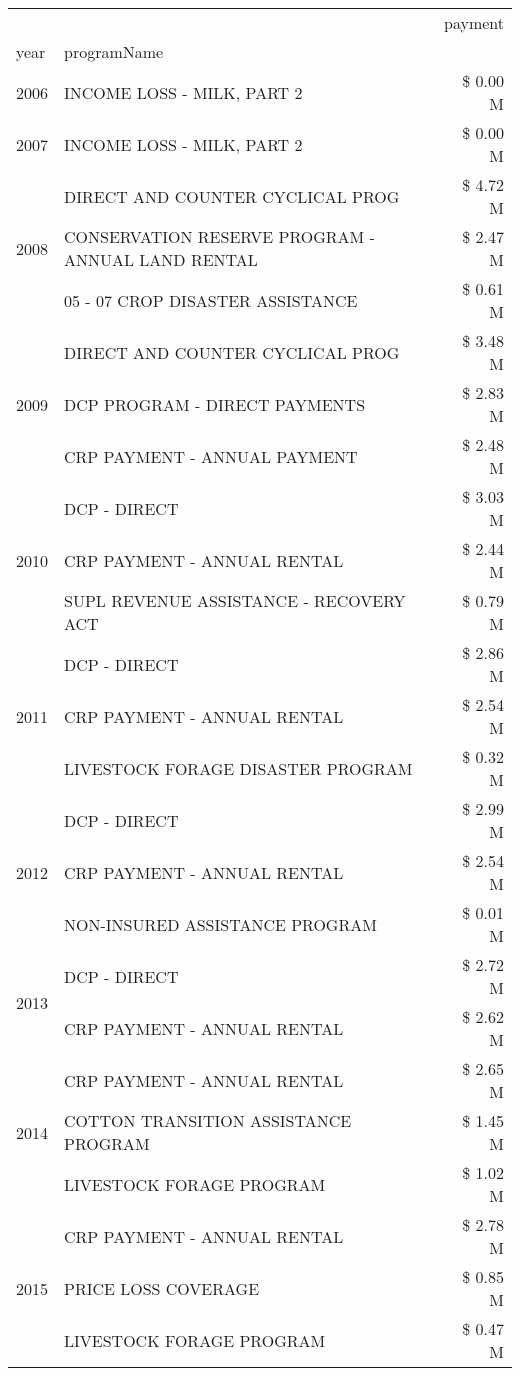 \begin{tabular}{llr}
\toprule
 &  & payment \\
year & programName &  \\
\midrule
2006 & INCOME LOSS - MILK, PART 2 & \$ 0.00 M \\
\cline{1-3}
2007 & INCOME LOSS - MILK, PART 2 & \$ 0.00 M \\
\cline{1-3}
\multirow[t]{3}{*}{2008} & DIRECT AND COUNTER CYCLICAL PROG & \$ 4.72 M \\
 & CONSERVATION RESERVE PROGRAM - ANNUAL LAND RENTAL & \$ 2.47 M \\
 & 05 - 07 CROP DISASTER ASSISTANCE & \$ 0.61 M \\
\cline{1-3}
\multirow[t]{3}{*}{2009} & DIRECT AND COUNTER CYCLICAL PROG & \$ 3.48 M \\
 & DCP PROGRAM - DIRECT PAYMENTS & \$ 2.83 M \\
 & CRP PAYMENT - ANNUAL PAYMENT & \$ 2.48 M \\
\cline{1-3}
\multirow[t]{3}{*}{2010} & DCP - DIRECT & \$ 3.03 M \\
 & CRP PAYMENT - ANNUAL RENTAL & \$ 2.44 M \\
 & SUPL REVENUE ASSISTANCE - RECOVERY ACT & \$ 0.79 M \\
\cline{1-3}
\multirow[t]{3}{*}{2011} & DCP - DIRECT & \$ 2.86 M \\
 & CRP PAYMENT - ANNUAL RENTAL & \$ 2.54 M \\
 & LIVESTOCK FORAGE DISASTER PROGRAM & \$ 0.32 M \\
\cline{1-3}
\multirow[t]{3}{*}{2012} & DCP - DIRECT & \$ 2.99 M \\
 & CRP PAYMENT - ANNUAL RENTAL & \$ 2.54 M \\
 & NON-INSURED ASSISTANCE PROGRAM & \$ 0.01 M \\
\cline{1-3}
\multirow[t]{2}{*}{2013} & DCP - DIRECT & \$ 2.72 M \\
 & CRP PAYMENT - ANNUAL RENTAL & \$ 2.62 M \\
\cline{1-3}
\multirow[t]{3}{*}{2014} & CRP PAYMENT - ANNUAL RENTAL & \$ 2.65 M \\
 & COTTON TRANSITION ASSISTANCE PROGRAM & \$ 1.45 M \\
 & LIVESTOCK FORAGE PROGRAM & \$ 1.02 M \\
\cline{1-3}
\multirow[t]{3}{*}{2015} & CRP PAYMENT - ANNUAL RENTAL & \$ 2.78 M \\
 & PRICE LOSS COVERAGE & \$ 0.85 M \\
 & LIVESTOCK FORAGE PROGRAM & \$ 0.47 M \\

\end{tabular}
